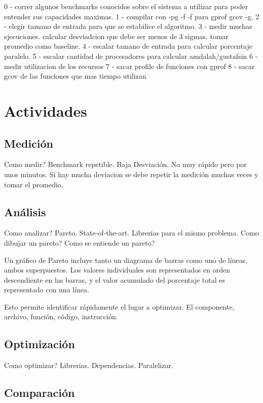 \documentclass[a4paper]{report}
\begin{document}
0 - correr algunos benchmarks conocidos sobre el sistema a utilizar para poder entender sus capacidades maximas.
1 - compilar con -pg -f -f para gprof gcov -g.
2 - elegir tamano de entrada para que se estabilice el algoritmo.
3 - medir muchas ejecuciones. calcular desviadcion que debe ser menos de 3 sigmas. tomar promedio como baseline.
4 - escalar tamano de entrada para calcular porcentaje paralelo.
5 - escalar cantidad de procesadores para calcular amdalah/gustafsin
6 - medir utilizacion de los recursos
7 - sacar profile de funciones con  gprof
8 - sacar gcov de las funciones que mas tiempo utilizan

\section{Actividades}

\subsection{Medici\'on}

Como medir? Benchmark repetible. Baja Desviaci\'on. No muy r\'apido pero por unos
minutos. Si hay mucha deviacion se debe repetir la medici\'on muchas veces y
tomar el promedio.

\subsection{An\'alisis}

Como analizar? Pareto. State-of-the-art. Librerias para el mismo problema.
Como dibujar un pareto? Como se entiende un pareto?

Un gr\'afico de Pareto incluye tanto un diagrama de barras como uno de l\'ineas, ambos superpuestos.
Los valores individuales son representados en orden descendiente en las barras, y el valor acumulado del porcentaje total es representado con una l\'inea.

Esto permite identificar r\'apidamente el lugar a optimizar. El componente, archivo, funci\'on, c\'odigo, instrucci\'on.

\subsection{Optimizaci\'on}

Como optimizar? Librerias. Dependencias. Paralelizar.

\subsection{Comparaci\'on}
\end{document}
